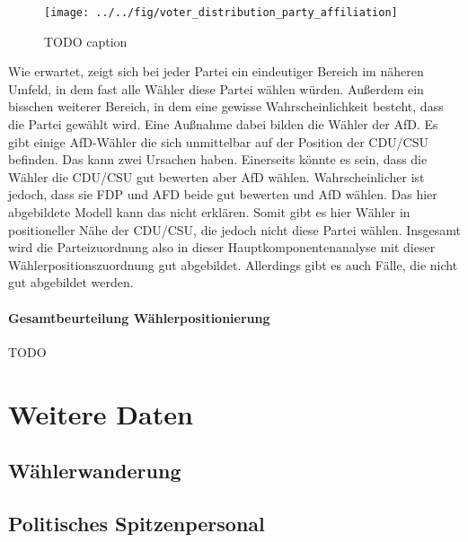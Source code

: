 \begin{figure}[htb]
	\centering
	\texttt{[image: ../../fig/voter\_distribution\_party\_affiliation]}
	\caption{TODO caption}
	\label{fig:voter-positions-pca-party-affiliation}
\end{figure}

Wie erwartet, zeigt sich bei jeder Partei ein eindeutiger Bereich im näheren Umfeld, in dem fast alle Wähler diese Partei wählen würden. Außerdem ein bisschen weiterer Bereich, in dem eine gewisse Wahrscheinlichkeit besteht, dass die Partei gewählt wird. Eine Außnahme dabei bilden die Wähler der AfD. Es gibt einige AfD-Wähler die sich unmittelbar auf der Position der CDU/CSU befinden. Das kann zwei Ursachen haben. Einerseits könnte es sein, dass die Wähler die CDU/CSU gut bewerten aber AfD wählen. Wahrscheinlicher ist jedoch, dass sie FDP und AFD beide gut bewerten und AfD wählen. Das hier abgebildete Modell kann das nicht erklären. Somit gibt es hier Wähler in positioneller Nähe der CDU/CSU, die jedoch nicht diese Partei wählen. Insgesamt wird die Parteizuordnung also in dieser Hauptkomponentenanalyse mit dieser Wählerpositionszuordnung gut abgebildet. Allerdings gibt es auch Fälle, die nicht gut abgebildet werden.

\paragraph{Gesamtbeurteilung Wählerpositionierung}
TODO

\section{Weitere Daten}\label{Sec-Weitere-Daten}

\subsection{Wählerwanderung}\label{Sec-Wählerwanderung}

\subsection{Politisches Spitzenpersonal}\label{Sec-Spitzenpersonal}
